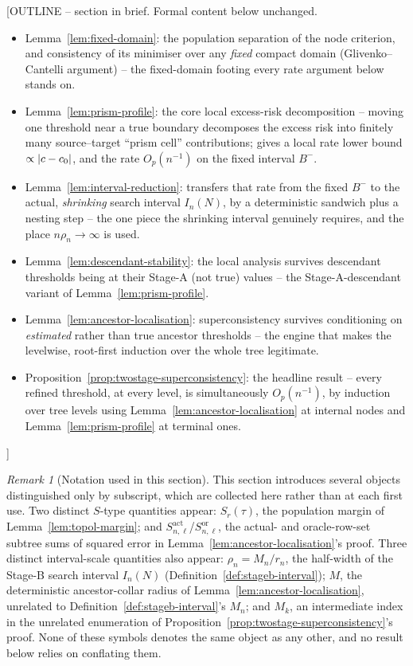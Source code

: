 \documentclass[11pt]{article}
\theoremstyle{plain}
\theoremstyle{definition}
\theoremstyle{remark}
\newtheorem{remark}[theorem]{Remark}
\DeclarePairedDelimiter{\abs}{\lvert}{\rvert}
\begin{document}
[OUTLINE -- section in brief. Formal content below unchanged.
\begin{itemize}
\item Lemma~\ref{lem:fixed-domain}: the population separation of the
  node criterion, and consistency of its minimiser over any \emph{fixed}
  compact domain (Glivenko--Cantelli argument) -- the fixed-domain footing
  every rate argument below stands on.
\item Lemma~\ref{lem:prism-profile}: the core local excess-risk
  decomposition -- moving one threshold near a true boundary decomposes
  the excess risk into finitely many source--target ``prism cell''
  contributions; gives a local rate lower bound $\propto\abs{c-c_0}$, and the
  rate $O_p(n^{-1})$ on the fixed interval $B^-$.
\item Lemma~\ref{lem:interval-reduction}: transfers that rate from the fixed
  $B^-$ to the actual, \emph{shrinking} search interval $I_n(N)$, by a
  deterministic sandwich plus a nesting step -- the one piece the shrinking
  interval genuinely requires, and the place $n\rho_n\to\infty$ is used.
\item Lemma~\ref{lem:descendant-stability}: the local analysis survives
  descendant thresholds being at their Stage-A (not true) values -- the
  Stage-A-descendant variant of Lemma~\ref{lem:prism-profile}.
\item Lemma~\ref{lem:ancestor-localisation}: superconsistency survives
  conditioning on \emph{estimated} rather than true ancestor thresholds --
  the engine that makes the levelwise, root-first induction over the
  whole tree legitimate.
\item Proposition~\ref{prop:twostage-superconsistency}: the headline
  result -- every refined threshold, at every level, is simultaneously
  $O_p(n^{-1})$, by induction over tree levels using
  Lemma~\ref{lem:ancestor-localisation} at internal nodes and
  Lemma~\ref{lem:prism-profile} at terminal ones.
\end{itemize}]

\begin{remark}[Notation used in this section]
This section introduces several objects distinguished only by
subscript, which are collected here rather than at each first use. Two
distinct $S$-type quantities appear: $S_r(\tau)$, the population margin of
Lemma~\ref{lem:topol-margin}; and
$S^{\mathrm{act}}_{n,\ell}$/$S^{\mathrm{or}}_{n,\ell}$, the actual- and
oracle-row-set subtree sums of squared error in
Lemma~\ref{lem:ancestor-localisation}'s proof. Three distinct interval-scale
quantities also appear: $\rho_n=M_n/r_n$, the half-width of the Stage-B
search interval $I_n(N)$ (Definition~\ref{def:stageb-interval}); $M$, the
deterministic ancestor-collar radius of
Lemma~\ref{lem:ancestor-localisation}, unrelated to
Definition~\ref{def:stageb-interval}'s $M_n$; and $M_k$,
an intermediate index in the unrelated enumeration of
Proposition~\ref{prop:twostage-superconsistency}'s proof. None of these
symbols denotes the same object as any other, and no result below relies
on conflating them.
\end{remark}
\end{document}

